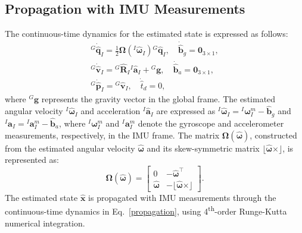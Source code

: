 \subsection{Propagation with IMU Measurements}
\label{sec: Propagation}

The continuous-time dynamics for the estimated state is expressed as follows:
\begin{equation}
\label{propagation}
    \begin{gathered}
        {}^G\dot{\hat{\mathbf{q}}}_I = \frac{1}{2} \mathbf{\Omega}({}^I\hat{\boldsymbol{\omega}}_I){}^G\hat{\mathbf{q}}_I, \quad
        \dot{\hat{\mathbf{b}}}_g = \mathbf{0}_{3 \times 1}, \\
        {}^G\dot{\hat{\mathbf{v}}}_I = {}^G\hat{\mathbf{R}}_I{}^I\hat{\mathbf{a}}_I + {}^G\mathbf{g}, \quad
        \dot{\hat{\mathbf{b}}}_a = \mathbf{0}_{3 \times 1}, \\
        {}^G\dot{\hat{\mathbf{p}}}_I = {}^G\hat{\mathbf{v}}_I, \quad
        \dot{\hat{t}}_d = 0,
    \end{gathered}
\end{equation}
where ${}^G\mathbf{g}$ represents the gravity vector in the global frame.
The estimated angular velocity ${}^I\hat{\boldsymbol{\omega}}_I$ and acceleration ${}^I\hat{\mathbf{a}}_I$ are expressed as ${}^I{\hat{\boldsymbol{\omega}}}_I = {}^I{\boldsymbol{\omega}}_I^m - \hat{\mathbf{b}}_g$ and ${}^I\hat{\mathbf{a}}_I = {}^I{\mathbf{a}}_I^m - \hat{\mathbf{b}}_a$, where ${}^I{\boldsymbol{\omega}}_I^m$ and ${}^I{\mathbf{a}}_I^m$ denote the gyroscope and accelerometer measurements, respectively, in the IMU frame. The matrix $\mathbf{\Omega}(\hat{\boldsymbol{\omega}})$, constructed from the estimated angular velocity $\hat{\boldsymbol{\omega}}$ and its skew-symmetric matrix $\lfloor \hat{\boldsymbol{\omega}} \times \rfloor$, is represented as: 
\begin{equation}
    \mathbf{\Omega}(\hat{\boldsymbol{\omega}}) = 
    \begin{bmatrix}
        0 & -\hat{\boldsymbol{\omega}}^\top \\
        \hat{\boldsymbol{\omega}} & -\lfloor \hat{\boldsymbol{\omega}} \times \rfloor
    \end{bmatrix}.
\end{equation}
The estimated state $\hat{\mathbf{x}}$ is propagated with IMU measurements through the continuous-time dynamics in Eq.~\eqref{propagation}, using 4\textsuperscript{th}-order Runge-Kutta numerical integration.

